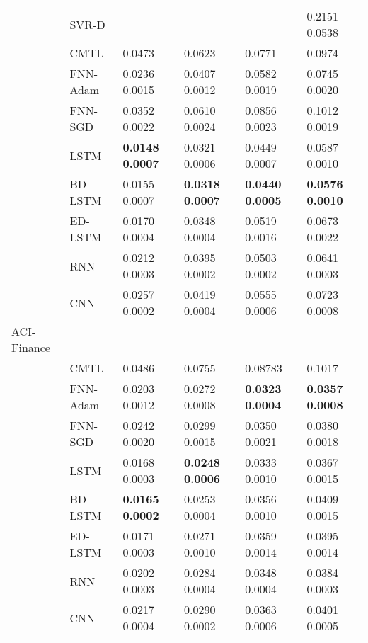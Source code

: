 \documentclass[final,5p,times,twocolumn]{elsarticle}
\begin{document}
\begin{table*}[htbp!]
\begin{tabular}{llllll}
 & SVR-D \cite{zhang2013iterated} &   	&   &	 & 0.2151  0.0538 \\
 
 
&CMTL \cite{chandra2017CMTLMulti} &   0.0473 &  0.0623  &0.0771	 & 0.0974  \\


&FNN-Adam & 0.0236	0.0015     	&0.0407	0.0012        &	0.0582	0.0019       &0.0745	0.0020\\

&FNN-SGD  &  0.0352	0.0022    	& 0.0610	0.0024       &	0.0856	0.0023       &0.1012	0.0019\\

&LSTM   &   \textbf{0.0148	0.0007 }  	& 0.0321	0.0006       &	0.0449	0.0007       &0.0587	0.0010\\

&BD-LSTM   &  0.0155	0.0007    	&   \textbf{0.0318	0.0007}     &\textbf{0.0440	0.0005}	       &\textbf{0.0576	0.0010}\\

&ED-LSTM   &   0.0170	0.0004   	& 0.0348	0.0004       &0.0519	0.0016	       &0.0673	0.0022\\

&RNN  &  0.0212	0.0003    	& 0.0395	0.0002       &0.0503	0.0002	       &0.0641	0.0003\\

&CNN &   0.0257	0.0002   	& 	0.0419	0.0004       &	0.0555	0.0006       &0.0723	0.0008\\
 \hline


 
 

ACI-Finance &    	  &	 &\\

&CMTL \cite{chandra2017CMTLMulti} &  0.0486  &  0.0755  &0.08783&0.1017  \\


&FNN-Adam & 0.0203   0.0012     	&  0.0272   0.0008       &\textbf{0.0323   0.0004}	       &\textbf{0.0357   0.0008}\\

&FNN-SGD  &   0.0242    0.0020 	&  0.0299    0.0015       &0.0350   0.0021	       &0.0380    0.0018\\

&LSTM   & 0.0168    0.0003    	& \textbf{0.0248    0.0006}      &0.0333   0.0010	       &0.0367   0.0015 \\

&BD-LSTM   &   \textbf{0.0165   0.0002}  	&  0.0253   0.0004     &0.0356  0.0010& 0.0409   0.0015\\

&ED-LSTM   &   0.0171   0.0003     	&  0.0271  0.0010       & 0.0359   0.0014 	       &0.0395   0.0014\\

&RNN  &   0.0202   0.0003   	&  0.0284  0.0004     &0.0348  0.0004 	       & 0.0384   0.0003\\

&CNN &  0.0217	0.0004   	&   0.0290	0.0002    &0.0363	0.0006	       & 0.0401	0.0005\\
\hline
\end{tabular}
\end{table*}
\end{document}
